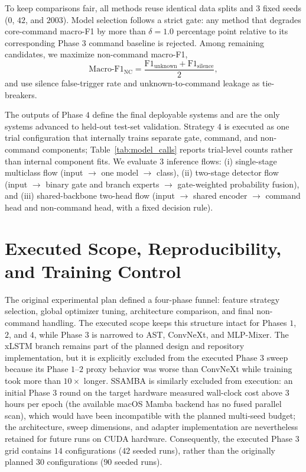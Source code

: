 \documentclass[cameraready]{Interspeech}
\begin{document}
To keep comparisons fair, all methods reuse identical data splits and $3$ fixed seeds ($0$, $42$, and $2003$). Model selection follows a strict gate: any method that degrades core-command macro-F1 by more than $\delta=1.0$ percentage point relative to its corresponding Phase $3$ command baseline is rejected. Among remaining candidates, we maximize non-command macro-F1,
$$
\mathrm{Macro\text{-}F1}_{\mathrm{NC}} = \frac{\mathrm{F1}_{\mathrm{unknown}} + \mathrm{F1}_{\mathrm{silence}}}{2},
$$
and use silence false-trigger rate and unknown-to-command leakage as tie-breakers.

The outputs of Phase $4$ define the final deployable systems and are the only systems advanced to held-out test-set validation. Strategy $4$ is executed as one trial configuration that internally trains separate gate, command, and non-command components; Table~\ref{tab:model_calls} reports trial-level counts rather than internal component fits. We evaluate $3$ inference flows: (i) single-stage multiclass flow (input $\rightarrow$ one model $\rightarrow$ class), (ii) two-stage detector flow (input $\rightarrow$ binary gate and branch experts $\rightarrow$ gate-weighted probability fusion), and (iii) shared-backbone two-head flow (input $\rightarrow$ shared encoder $\rightarrow$ command head and non-command head, with a fixed decision rule).

\section{Executed Scope, Reproducibility, and Training Control}
The original experimental plan defined a four-phase funnel: feature strategy selection, global optimizer tuning, architecture comparison, and final non-command handling. The executed scope keeps this structure intact for Phases $1$, $2$, and $4$, while Phase $3$ is narrowed to AST, ConvNeXt, and MLP-Mixer. The xLSTM branch remains part of the planned design and repository implementation, but it is explicitly excluded from the executed Phase $3$ sweep because its Phase $1$--$2$ proxy behavior was worse than ConvNeXt while training took more than $10\times$ longer. SSAMBA is similarly excluded from execution: an initial Phase $3$ round on the target hardware measured wall-clock cost above $3$ hours per epoch (the available macOS Mamba backend has no fused parallel scan), which would have been incompatible with the planned multi-seed budget; the architecture, sweep dimensions, and adapter implementation are nevertheless retained for future runs on CUDA hardware. Consequently, the executed Phase $3$ grid contains $14$ configurations ($42$ seeded runs), rather than the originally planned $30$ configurations ($90$ seeded runs).
\end{document}
